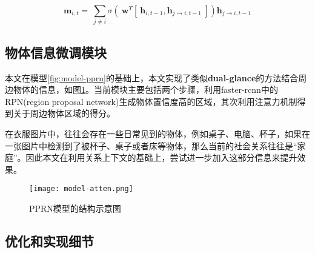 \begin{equation}
    \label{eq:model-mp-atten}
	\bm{m}_{i,t} = ~\sum_{j\neq i} \sigma{(~\bm{w}^T[~\bm{h}_{i,t-1},\bm{h}_{j \to i,t-1}~]) \bm{h}_{j \to i,t-1}}	
\end{equation}



\subsection{物体信息微调模块}

本文在模型\ref{fig:model-pprn}的基础上，本文实现了类似\textbf{dual-glance}的方法结合周边物体的信息，如图\ref{fig:model-atten}。当前模块主要包括两个步骤，利用faster-rcnn中的RPN(region proposal network)生成物体置信度高的区域，其次利用注意力机制得到关于周边物体区域的得分。

在衣服图片中，往往会存在一些日常见到的物体，例如桌子、电脑、杯子，如果在一张图片中检测到了被杯子、桌子或者床等物体，那么当前的社会关系往往是``家庭''。因此本文在利用关系上下文的基础上，尝试进一步加入这部分信息来提升效果。
\begin{figure}[htpb]
	\centering
	\texttt{[image: model-atten.png]}
    \caption{PPRN模型的结构示意图}
	\vspace*{-3.5mm}
	\label{fig:model-atten}
\end{figure}


\subsection{优化和实现细节}


